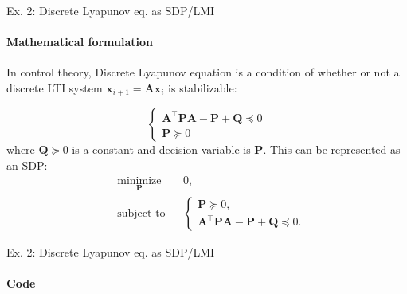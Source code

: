 \documentclass{beamer}
\begin{document}
\begin{frame}{Ex. 2: Discrete Lyapunov eq. as SDP/LMI}
\framesubtitle{Mathematical formulation}
\begin{flushleft}

In control theory, Discrete Lyapunov equation is a condition of whether or not a discrete LTI system $\mathbf{x}_{i+1} = \mathbf{A}\mathbf{x}_i$ is stabilizable:

\begin{equation}
    \begin{cases}
        \mathbf{A}^\top \mathbf{P}\mathbf{A} - \mathbf{P} + \mathbf{Q} \preceq 0 \\
        \mathbf{P} \succeq 0
    \end{cases}
\end{equation}
%
where $\mathbf{Q} \succeq 0$ is a constant and decision variable is $\mathbf{P}$. This can be represented as an SDP:
%
\begin{equation}
\begin{aligned}
& \underset{\mathbf{P}}{\text{minimize}}
& & 0, \\
& \text{subject to}
& & \begin{cases}
    \mathbf{P} \succeq 0, \\
    \mathbf{A}^\top \mathbf{P}\mathbf{A} - \mathbf{P} + \mathbf{Q} \preceq 0.
    \end{cases}
\end{aligned}
\end{equation}


\end{flushleft}
\end{frame}



\begin{frame}{Ex. 2: Discrete Lyapunov eq. as SDP/LMI}
\framesubtitle{Code}
\begin{flushleft}



\end{flushleft}
\end{frame}
\end{document}
